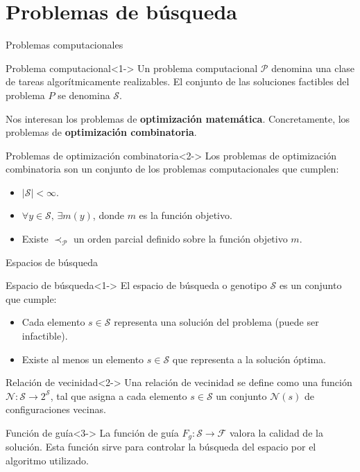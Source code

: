 \documentclass[aspectratio=169,table,xcdraw]{beamer}
\begin{document}
\section{Problemas de búsqueda}
\begin{frame}{Problemas computacionales}
    \begin{block}{Problema computacional}<1->
        Un \alert{problema computacional} $\mathcal{P}$ denomina una clase de tareas algorítmicamente realizables. El conjunto de las \alert{soluciones factibles} del problema $P$ se denomina $\mathscr{S}$.
    \end{block}
    Nos interesan los problemas de \textbf{optimización matemática}. Concretamente, los problemas de \textbf{optimización combinatoria}.
    \begin{block}{Problemas de optimización combinatoria}<2->
        Los problemas de \alert{optimización combinatoria} son un conjunto de los problemas computacionales que cumplen:
        \begin{itemize}
            \item $|\mathscr{S}|<\infty$.
            \item $\forall y \in \mathscr{S},\, \exists m(y)$, donde $m$ es la función objetivo.
            \item Existe $\prec_\mathcal{P}$ un orden parcial definido sobre la función objetivo $m$.
        \end{itemize}
    \end{block}
\end{frame}
\begin{frame}{Espacios de búsqueda}
    \begin{block}{Espacio de búsqueda}<1->
        El \alert{espacio de búsqueda} o \alert{genotipo} $\mathcal{S}$ es un conjunto que cumple:
        \begin{itemize}
            \item Cada elemento $s\in \mathcal{S}$ representa una solución del problema (puede ser infactible).
            \item Existe al menos un elemento $s\in\mathcal{S}$ que representa a la solución óptima.
        \end{itemize}
    \end{block}
    \begin{block}{Relación de vecinidad}<2->
        Una \alert{relación de vecinidad} se define como una función $\mathcal{N}:\mathcal{S}\rightarrow2^\mathcal{S}$, tal que asigna a cada elemento $s\in\mathcal{S}$ un conjunto $\mathcal{N}(s)$ de configuraciones vecinas.
    \end{block}
    \begin{block}{Función de guía}<3->
        La \alert{función de guía} $F_g:\mathcal{S}\rightarrow \mathscr{F}$ valora la calidad de la solución. Esta función sirve para controlar la búsqueda del espacio por el algoritmo utilizado.
    \end{block}
\end{frame}
\end{document}
